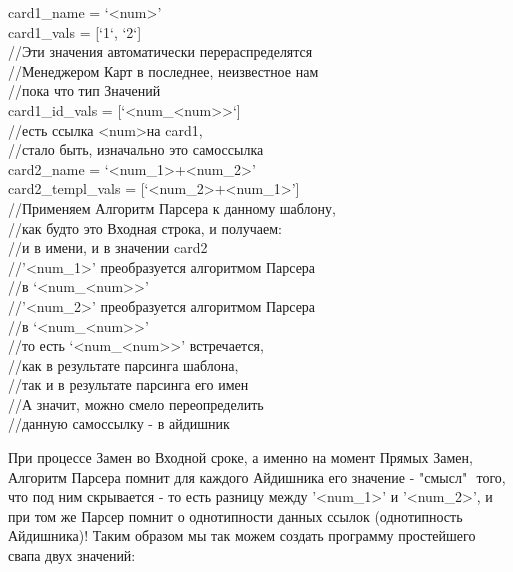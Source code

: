 \documentclass{book}
\newcommand{\less}{\textless}
\newcommand{\more}{\textgreater}
\begin{document}
\begin{tcolorbox}[breakable]
card1\_name = `\less num\more' \\
card1\_vals = [`1`, `2`] \\
//Эти значения автоматически перераспределятся \\
//Менеджером Карт в последнее, неизвестное нам \\
//пока что тип Значений \\
card1\_id\_vals = [`\less num\_\less num\more\more`] \\
//есть ссылка \less num\more на card1, \\
//стало быть, изначально это самоссылка \\

card2\_name = `\less num\_1\more+\less num\_2\more' \\
card2\_templ\_vals = [`\less num\_2\more+\less num\_1\more'] \\

//Применяем Алгоритм Парсера к данному шаблону, \\
//как будто это Входная строка, и получаем: \\
//и в имени, и в значении card2 \\
//'\less num\_1\more' преобразуется алгоритмом Парсера \\
//в `\less num\_\less num\more\more' \\
//'\less num\_2\more' преобразуется алгоритмом Парсера \\
//в `\less num\_\less num\more\more' \\
//то есть `\less num\_\less num\more\more' встречается, \\
//как в результате парсинга шаблона, \\
//так и в результате парсинга его имен \\
//А значит, можно смело переопределить \\
//данную самоссылку - в айдишник
\end{tcolorbox}


При процессе Замен во Входной сроке, а именно на момент Прямых Замен, Алгоритм Парсера помнит для каждого Айдишника его значение - "смысл" $ $ того, что под ним скрывается - то есть разницу между '<num\_1>' и '<num\_2>', и при том же Парсер помнит о однотипности данных ссылок (однотипность Айдишника)! Таким образом мы так можем создать программу простейшего свапа двух значений:
\end{document}
